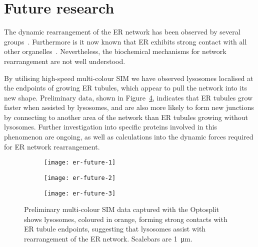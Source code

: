 \section{Future research} \label{sec:ERfuture}
The dynamic rearrangement of the ER network has been observed by several groups~\cite{nixon2016increased, pendin2011balancing, yamanaka2018er}.
Furthermore is it now known that ER exhibits strong contact with all other organelles~\cite{valm2017applying, guo2018visualizing}.
Nevertheless, the biochemical mechanisms for network rearrangement are not well understood.

By utilising high-speed multi-colour SIM we have observed lysosomes localised at the endpoints of growing ER tubules, which appear to pull the network into its new shape.
Preliminary data, shown in Figure~\ref{fig:er-future}, indicates that ER tubules grow faster when assisted by lysosomes, and are also more likely to form new junctions by connecting to another area of the network than ER tubules growing without lysosomes.
Further investigation into specific proteins involved in this phenomenon are ongoing, as well as calculations into the dynamic forces required for ER network rearrangement.

\begin{figure}[htbp!]
	\centering
		\begin{subfigure}[b]{0.325\textwidth}
		\texttt{[image: er-future-1]}
		\caption{} \label{fig:er-future-1}
	\end{subfigure}
	\hfill
	\begin{subfigure}[b]{0.325\textwidth}
		\texttt{[image: er-future-2]}
		\caption{} \label{fig:er-future-2}
	\end{subfigure}
	\hfill
	\begin{subfigure}[b]{0.325\textwidth}
		\texttt{[image: er-future-3]}
		\caption{} \label{fig:er-future-3}
	\end{subfigure}
	\caption[ER: Lysosomes form strong contacts with ER tubule endpoints to rearrange the network]{Preliminary multi-colour SIM data captured with the Optosplit shows lysosomes, coloured in orange, forming strong contacts with ER tubule endpoints, suggesting that lysosomes assist with rearrangement of the ER network. Scalebars are \SI{1}{\micro\metre}.}
	\label{fig:er-future}
\end{figure}
